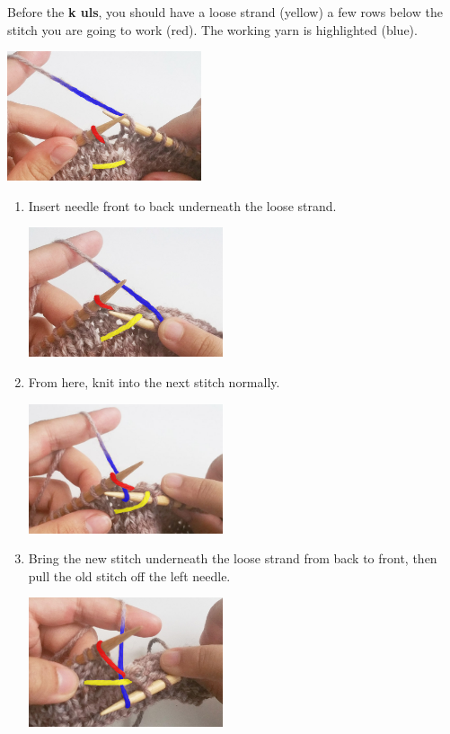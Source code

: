 \documentclass[12pt]{article}
\begin{document}
\begin{multicols}{2}
\vfill
\columnbreak
Before the \textbf{k uls}, you should have a loose strand (yellow) a few rows below the stitch you are going to work (red). The working yarn is highlighted (blue).

\begin{flushright}
\includegraphics[height=1.5in]{setup.jpg}
\end{flushright}

\begin{enumerate}
\item Insert needle front to back underneath the loose strand.

\begin{flushright}
\includegraphics[height=1.5in]{step1.jpg}
\end{flushright}

\item From here, knit into the next stitch normally.

\begin{flushright}
\includegraphics[height=1.5in]{step2.jpg}
\end{flushright}

\item Bring the new stitch underneath the loose strand from back to front, then pull the old stitch off the left needle.

\begin{flushright}
\includegraphics[height=1.5in]{step3.jpg}
\end{flushright}


\end{enumerate}

\end{multicols}
\end{document}

